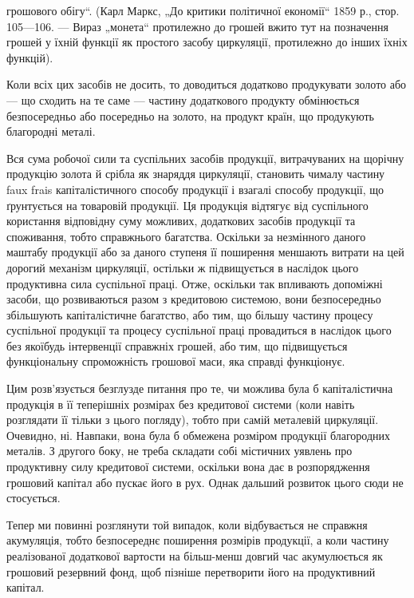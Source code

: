 \parcont{}  %
грошового обігу“. (Карл Маркс, „До критики політичної економії“
1859 р., стор. 105—106. — Вираз „монета“ протилежно до грошей вжито
тут на позначення грошей у їхній функції як простого засобу циркуляції,
протилежно до інших їхніх функцій).

Коли всіх цих засобів не досить, то доводиться додатково продукувати
золото або — що сходить на те саме — частину додаткового продукту
обмінюється безпосередньо або посередньо на золото, на продукт країн,
що продукують благородні металі.

Вся сума робочої сили та суспільних засобів продукції, витрачуваних
на щорічну продукцію золота й срібла як знаряддя циркуляції, становить
чималу частину faux frais капіталістичного способу продукції і взагалі
способу продукції, що ґрунтується на товаровій продукції. Ця продукція
відтягує від суспільного користання відповідну суму можливих,
додаткових засобів продукції та споживання, тобто справжнього багатства.
Оскільки за незмінного даного маштабу продукції або за даного ступеня
її поширення меншають витрати на цей дорогий механізм циркуляції,
остільки ж підвищується в наслідок цього продуктивна сила суспільної
праці. Отже, оскільки так впливають допоміжні засоби, що розвиваються
разом з кредитовою системою, вони безпосередньо збільшують капіталістичне
багатство, або тим, що більшу частину процесу суспільної продукції
та процесу суспільної праці провадиться в наслідок цього без
якоїбудь інтервенції справжніх грошей, або тим, що підвищується
функціональну спроможність грошової маси, яка справді функціонує.

Цим розв’язується безглузде питання про те, чи можлива була б
капіталістична продукція в її теперішніх розмірах без кредитової системи
(коли навіть розглядати її тільки з цього погляду), тобто при самій
металевій циркуляції. Очевидно, ні. Навпаки, вона була б обмежена розміром
продукції благородних металів. З другого боку, не треба складати собі
містичних уявлень про продуктивну силу кредитової системи, оскільки
вона дає в розпорядження грошовий капітал або пускає його в рух.
Однак дальший розвиток цього сюди не стосується.

Тепер ми повинні розглянути той випадок, коли відбувається не
справжня акумуляція, тобто безпосереднє поширення розмірів продукції,
а коли частину реалізованої додаткової вартости на більш-менш довгий
час акумулюється як грошовий резервний фонд, щоб пізніше перетворити
його на продуктивний капітал.

